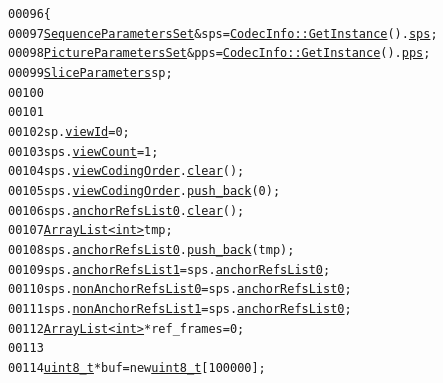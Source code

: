 \begin{footnotesize}\begin{alltt}
00096         \{
00097                 \hyperlink{struct_sequence_parameters_set}{SequenceParametersSet} &sps = \hyperlink{class_codec_info_ad439fd8062a03d868dfe9c9b615b747e}{CodecInfo::GetInstance}().\hyperlink{class_codec_info_aee785011cec77ff3c0c646b498fe1e7d}{sps};
00098                 \hyperlink{struct_picture_parameters_set}{PictureParametersSet} &pps = \hyperlink{class_codec_info_ad439fd8062a03d868dfe9c9b615b747e}{CodecInfo::GetInstance}().\hyperlink{class_codec_info_abaa8d84a7d4045129ee64d91eaac4481}{pps};
00099                 \hyperlink{struct_slice_parameters}{SliceParameters} sp;
00100 
00101 
00102                 sp.\hyperlink{struct_slice_parameters_ae570f1ba10b1e091c7519264534a7143}{viewId} = 0;
00103                 sps.\hyperlink{struct_sequence_parameters_set_af32c7819f630856ccd99aaf78e8f656c}{viewCount} = 1;
00104                 sps.\hyperlink{struct_sequence_parameters_set_a082e13208bc0afd9377676e156e750b4}{viewCodingOrder}.\hyperlink{class_array_list_acb53d54675318c94332d0ec8b6819eb3}{clear}();
00105                 sps.\hyperlink{struct_sequence_parameters_set_a082e13208bc0afd9377676e156e750b4}{viewCodingOrder}.\hyperlink{class_array_list_a7b5376678a9b5af0e0ed913fbe04b902}{push_back}(0);
00106                 sps.\hyperlink{struct_sequence_parameters_set_ae9b6a7d85da9fec255cca59c3d750ecd}{anchorRefsList0}.\hyperlink{class_array_list_acb53d54675318c94332d0ec8b6819eb3}{clear}();
00107                 \hyperlink{class_array_list}{ArrayList<int>} tmp;
00108                 sps.\hyperlink{struct_sequence_parameters_set_ae9b6a7d85da9fec255cca59c3d750ecd}{anchorRefsList0}.\hyperlink{class_array_list_a7b5376678a9b5af0e0ed913fbe04b902}{push_back}(tmp);
00109                 sps.\hyperlink{struct_sequence_parameters_set_a7b865f89c34428785081c3c4acadc965}{anchorRefsList1} = sps.\hyperlink{struct_sequence_parameters_set_ae9b6a7d85da9fec255cca59c3d750ecd}{anchorRefsList0};
00110                 sps.\hyperlink{struct_sequence_parameters_set_ab9b078b23e746ef60f7697896b963b93}{nonAnchorRefsList0} = sps.\hyperlink{struct_sequence_parameters_set_ae9b6a7d85da9fec255cca59c3d750ecd}{anchorRefsList0};
00111                 sps.\hyperlink{struct_sequence_parameters_set_a68b7ffb23b151c53312798f7ab79a67a}{nonAnchorRefsList1} = sps.\hyperlink{struct_sequence_parameters_set_ae9b6a7d85da9fec255cca59c3d750ecd}{anchorRefsList0};
00112                 \hyperlink{class_array_list}{ArrayList<int>} *ref\_frames = 0;
00113 
00114                 \hyperlink{_types_8h_a363e4d606232036a6b89060813c45489}{uint8_t} *buf = \textcolor{keyword}{new} \hyperlink{_types_8h_a363e4d606232036a6b89060813c45489}{uint8_t}[100000];

\end{alltt}
\end{footnotesize}
